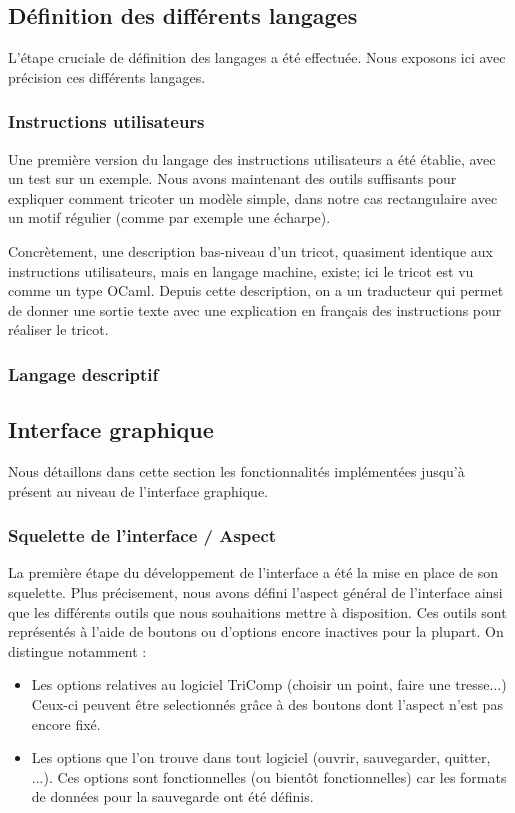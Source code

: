 \documentclass{article}
\begin{document}
\subsection{Définition des différents langages}

L'étape cruciale de définition des langages a été effectuée. Nous exposons ici avec précision ces différents langages.

\subsubsection{Instructions utilisateurs}

Une première version du langage des instructions utilisateurs a été établie, avec un test sur un exemple. Nous avons maintenant des outils 
suffisants pour expliquer comment tricoter un modèle simple, dans notre cas rectangulaire avec un motif régulier (comme par exemple une écharpe). 

Concrètement, une description bas-niveau d'un tricot, quasiment identique aux instructions utilisateurs, mais en langage machine, existe; ici le tricot est vu comme un type OCaml. Depuis cette description, on a un traducteur qui permet de donner une sortie texte avec une explication en français des instructions pour réaliser le tricot.

\subsubsection{Langage descriptif}

\subsection{Interface graphique}

Nous détaillons dans cette section les fonctionnalités implémentées jusqu'à présent au niveau de l'interface graphique.

\subsubsection{Squelette de l'interface / Aspect}

La première étape du développement de l'interface a été la mise en place de son squelette. Plus précisement, nous avons défini l'aspect 
général de l'interface ainsi que les différents outils que nous souhaitions mettre à disposition. Ces outils sont représentés à l'aide de 
boutons ou d'options encore inactives pour la plupart. On distingue notamment :
\begin{itemize}
  \item Les options relatives au logiciel TriComp (choisir un point, faire une tresse...) Ceux-ci peuvent être selectionnés grâce à des 
boutons dont l'aspect n'est pas encore fixé. %
  \item Les options que l'on trouve dans tout logiciel (ouvrir, sauvegarder, quitter, ...). Ces options sont fonctionnelles (ou bientôt 
fonctionnelles) car les formats de données pour la sauvegarde ont été définis.
\end{itemize}
\end{document}
